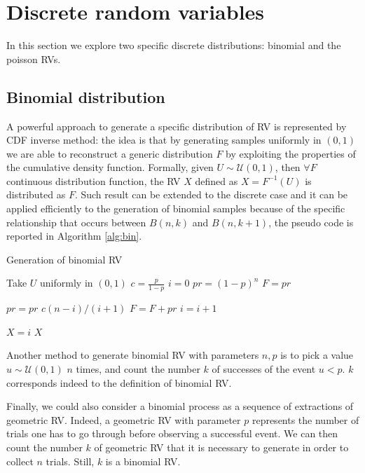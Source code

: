 \documentclass[twoside,onecolumn]{article}
\theoremstyle{definition}
\begin{document}
\section{Discrete random variables}
In this section we explore two specific discrete distributions: binomial and the poisson RVs.
\subsection{Binomial distribution}

A powerful approach to generate a specific distribution of RV is represented by CDF inverse method: the idea is that by generating samples uniformly in $(0,1)$ we are able to reconstruct a generic distribution  $F$ by exploiting the properties of the cumulative density function.
Formally, given $U\sim \mathcal U (0,1)$, then $\forall F$ continuous distribution function, the RV $X$ defined as $X=F^{-1}(U)$ is distributed as $F$. Such result can be extended to the discrete case and it can be applied efficiently to the generation of binomial samples because of the specific relationship that occurs between $B(n,k)$ and $B(n,k+1)$, the pseudo code is reported in Algorithm \ref{alg:bin}.


\begin{algorithm}
\caption{Generation of binomial RV}\label{alg:bin}
\begin{algorithmic}
\State Take $U$ uniformly in $(0,1)$
\State $c=\frac{p}{1-p}$
\State $i=0$
\State $pr=(1-p)^n$
\State$F=pr$

 \State$pr = pr\,\,{c(n-i)/(i+1)}$
\State $F=F+pr$
\State $i=i+1$
\EndWhile

\State$ X=i$
\State\Return $X$
\end{algorithmic}
\end{algorithm}

Another method to generate binomial RV with parameters $n,p$ is to pick a value $ u \sim \mathcal U(0,1)$ $n$ times, and count the number $k$ of successes of the event $u<p$. $k$ corresponds indeed to the definition of binomial RV.\par
Finally, we could also consider a binomial process as a sequence of extractions of geometric RV. Indeed, a geometric RV with parameter $p$ represents the number of trials one has to go through before observing a successful event. We can then count the number $k$ of geometric RV that it is necessary to generate in order to collect $n$ trials. Still,  $k$ is a binomial RV.
\end{document}
